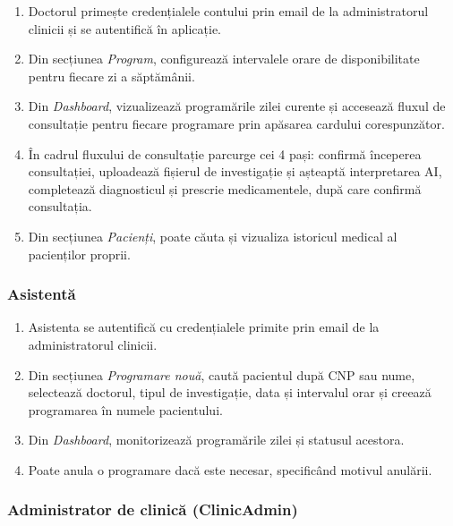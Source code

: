\documentclass[12pt, a4paper]{report}
\begin{document}
\begin{enumerate}
    \item Doctorul primește credențialele contului prin email de la administratorul
          clinicii și se autentifică în aplicație.
    \item Din secțiunea \textit{Program}, configurează intervalele orare de
          disponibilitate pentru fiecare zi a săptămânii.
    \item Din \textit{Dashboard}, vizualizează programările zilei curente și
          accesează fluxul de consultație pentru fiecare programare prin apăsarea
          cardului corespunzător.
    \item În cadrul fluxului de consultație parcurge cei 4 pași: confirmă
          începerea consultației, uploadează fișierul de investigație și
          așteaptă interpretarea AI, completează diagnosticul și prescrie
          medicamentele, după care confirmă consultația.
    \item Din secțiunea \textit{Pacienți}, poate căuta și vizualiza istoricul
          medical al pacienților proprii.
\end{enumerate}

\subsubsection{Asistentă}

\begin{enumerate}
    \item Asistenta se autentifică cu credențialele primite prin email de la
          administratorul clinicii.
    \item Din secțiunea \textit{Programare nouă}, caută pacientul după CNP sau
          nume, selectează doctorul, tipul de investigație, data și intervalul
          orar și creează programarea în numele pacientului.
    \item Din \textit{Dashboard}, monitorizează programările zilei și statusul
          acestora.
    \item Poate anula o programare dacă este necesar, specificând motivul anulării.
\end{enumerate}

\subsubsection{Administrator de clinică (ClinicAdmin)}
\end{document}
